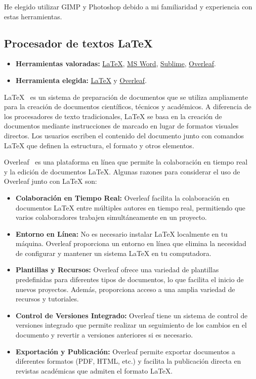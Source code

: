 He elegido utilizar GIMP y Photoshop debido a mi familiaridad y experiencia con estas herramientas.

\subsection{Procesador de textos \LaTeX}\label{4:latex}
\begin{itemize}
    \item \textbf{Herramientas valoradas:} \href{https://www.latex-project.org/}{\LaTeX}, \href{https://www.microsoft.com/es-es/microsoft-365/word}{MS Word}, \href{https://www.sublimetext.com/}{Sublime}, \href{https://www.overleaf.com/}{Overleaf}.
    \item \textbf{Herramienta elegida:} \href{https://www.latex-project.org/}{\LaTeX} y \href{https://www.overleaf.com/}{Overleaf}.
\end{itemize}
\LaTeX{}~\cite{misc:Latex} es un sistema de preparación de documentos que se utiliza ampliamente para la creación de documentos científicos, técnicos y académicos. A diferencia de los procesadores de texto tradicionales, LaTeX se basa en la creación de documentos mediante instrucciones de marcado en lugar de formatos visuales directos. Los usuarios escriben el contenido del documento junto con comandos LaTeX que definen la estructura, el formato y otros elementos.

Overleaf~\cite{misc:Overleaf} es una plataforma en línea que permite la colaboración en tiempo real y la edición de documentos LaTeX. Algunas razones para considerar el uso de Overleaf junto con LaTeX son:
\begin{itemize}
	\item \textbf{Colaboración en Tiempo Real:}
Overleaf facilita la colaboración en documentos LaTeX entre múltiples autores en tiempo real, permitiendo que varios colaboradores trabajen simultáneamente en un proyecto.

\item \textbf{Entorno en Línea:}
No es necesario instalar LaTeX localmente en tu máquina. Overleaf proporciona un entorno en línea que elimina la necesidad de configurar y mantener un sistema LaTeX en tu computadora.

\item \textbf{Plantillas y Recursos:}
Overleaf ofrece una variedad de plantillas predefinidas para diferentes tipos de documentos, lo que facilita el inicio de nuevos proyectos. Además, proporciona acceso a una amplia variedad de recursos y tutoriales.

\item \textbf{Control de Versiones Integrado:}
Overleaf tiene un sistema de control de versiones integrado que permite realizar un seguimiento de los cambios en el documento y revertir a versiones anteriores si es necesario.

\item \textbf{Exportación y Publicación:}
Overleaf permite exportar documentos a diferentes formatos (PDF, HTML, etc.) y facilita la publicación directa en revistas académicas que admiten el formato LaTeX.
\end{itemize}
\pagebreak

